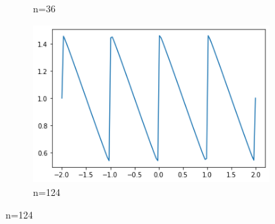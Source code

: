 \documentclass{article}
\begin{document}
\begin{figure}[h!]
\begin{subfigure}[b]{0.2\linewidth}
		\caption{n=36}
	\end{subfigure}
	\begin{subfigure}[b]{0.2\linewidth}
		\includegraphics[width=\linewidth]{img/f1_n124.png}
		\caption{n=124}
	\end{subfigure}
\end{figure}
\end{document}
